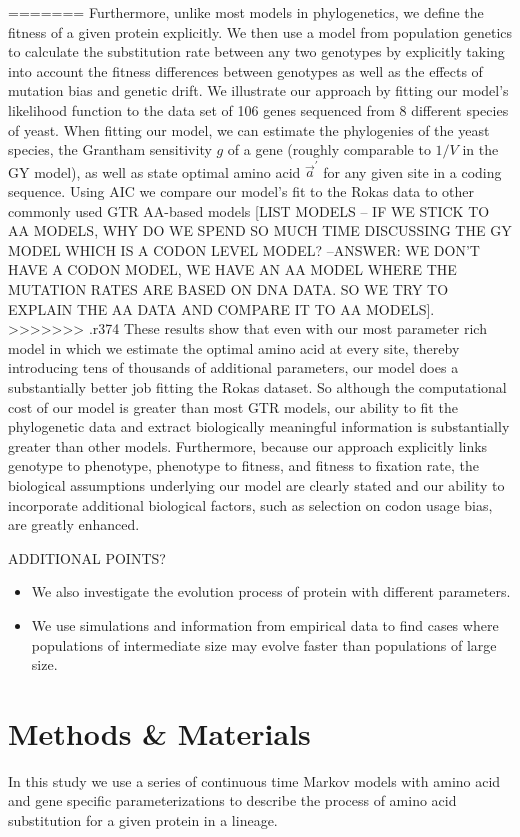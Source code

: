 \documentclass[13pt]{article}
\newcommand{\avecopt}{\ensuremath{\vec{a}^\prime}\xspace}
\begin{document}
=======
Furthermore, unlike most models in phylogenetics, we define the fitness of a given protein explicitly.
We then use a model from population genetics to calculate the substitution rate between any two genotypes by explicitly taking into account the fitness differences between genotypes as well as the effects of mutation bias and genetic drift.
We illustrate our approach by fitting our model's likelihood function to the \cite{RokasEtAl03} data set of 106 genes sequenced from 8 different species of yeast.
When fitting our model, we can estimate the phylogenies of the yeast species, the Grantham sensitivity $g$ of a gene (roughly comparable to $1/V$ in the GY model), as well as state optimal amino acid $\avecopt$ for any given site in a coding sequence.
Using AIC we compare our model's fit to the Rokas data to other commonly used GTR AA-based models [LIST MODELS -- IF WE STICK TO AA MODELS, WHY DO WE SPEND SO MUCH TIME DISCUSSING THE GY MODEL WHICH IS A CODON LEVEL MODEL? --ANSWER: WE DON'T HAVE A CODON MODEL, WE HAVE AN AA MODEL WHERE THE MUTATION RATES ARE BASED ON DNA DATA. SO WE TRY TO EXPLAIN THE AA DATA AND COMPARE IT TO AA MODELS].
>>>>>>> .r374
These results show that even with our most parameter rich model in which we estimate the optimal amino acid at every site, thereby introducing tens of thousands of additional parameters, our model does a substantially better job fitting the Rokas dataset.
So although the computational cost of our model is greater than most GTR models,  our ability to fit the phylogenetic data and extract biologically meaningful information is substantially greater than other models.
Furthermore, because our approach explicitly links genotype to phenotype, phenotype to fitness, and fitness to fixation rate, the biological assumptions underlying our model are clearly stated and our ability to incorporate additional biological factors, such as selection on codon usage bias, are greatly enhanced.
 
ADDITIONAL POINTS?
\begin{itemize}
\item We also investigate the evolution process of protein with different parameters.
\item We use simulations and information from empirical data to find cases where populations of intermediate size may evolve faster than populations of large size.
\end{itemize}


\section{Methods \& Materials}
In this study we use a series of continuous time Markov models with amino acid and gene specific parameterizations to describe the process of amino acid substitution for a given protein in a lineage. 
\end{document}
